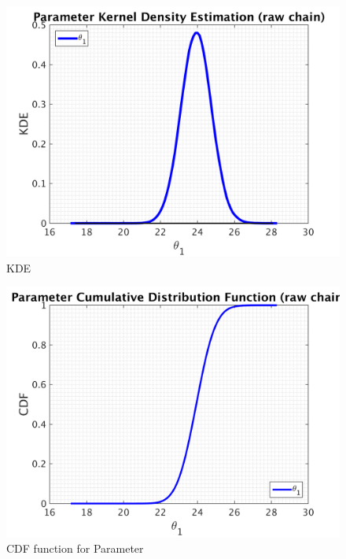 \begin{figure}[H]
  
  \centering
   \includegraphics[scale=0.75]{100_results/outputData_20/simple_ip_kde_raw}
   \caption{ KDE }
\end{figure}

\begin{figure}[H]
  
  \centering
   \includegraphics[scale=0.75]{100_results/outputData_20/simple_ip_cdf_raw}
   \caption{CDF function for Parameter }
\end{figure}



